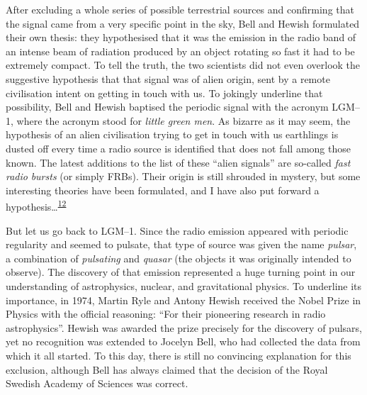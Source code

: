 After excluding a whole series of possible terrestrial sources and confirming that the
signal came from a very specific point in the sky, Bell and Hewish
formulated their own thesis: they hypothesised that it was the emission in the radio
band of an intense beam of radiation produced by an object rotating so fast it had to be
extremely compact. To tell the truth, the two scientists did not even overlook the
suggestive hypothesis that that signal was of alien origin, sent by a remote
civilisation intent on getting in touch with us. To jokingly underline that possibility,
Bell and Hewish baptised the periodic signal with the acronym
LGM--1, where the acronym stood for \emph{little green men}. As
bizarre as it may seem, the hypothesis of an alien civilisation trying to get in touch
with us earthlings is dusted off every time a radio source is identified that does not
fall among those known. The latest additions to the list of these ``alien signals'' are
so-called \emph{fast radio} \emph{bursts} (or simply FRBs). Their
origin is still shrouded in mystery, but some interesting theories have been formulated,
and I have also put forward a hypothesis\ldots \textsuperscript{\hyperlink{note:05-12}{12}}

But let us go back to LGM--1. Since the radio emission appeared with periodic regularity
and seemed to pulsate, that type of source was given the name
\emph{pulsar}, a combination of \emph{pulsating} and
\emph{quasar} (the objects it was originally intended to observe).
The discovery of that emission represented a huge turning point in our understanding of
astrophysics, nuclear, and gravitational physics. To underline its importance, in 1974,
Martin Ryle and Antony Hewish received the Nobel
Prize in Physics with the official reasoning: ``For their pioneering research in radio
astrophysics''. Hewish was awarded the prize precisely for the
discovery of pulsars, yet no recognition was extended to Jocelyn Bell, who had collected
the data from which it all started. To this day, there is still no convincing
explanation for this exclusion, although Bell has always claimed that the decision of
the Royal Swedish Academy of Sciences was correct.

